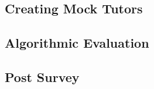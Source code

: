 
\subsection{Creating Mock Tutors}
\label{sec:mock}


\subsection{Algorithmic Evaluation}
\label{sec:algor-eval}


\subsection{Post Survey}
\label{sec:post-survey}


